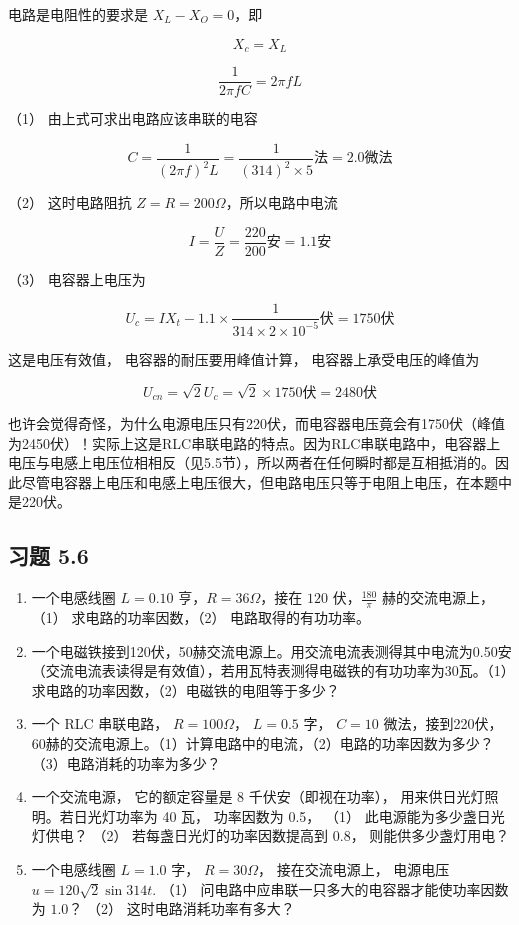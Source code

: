 电路是电阻性的要求是 \(X_{L} - X_{O} = 0\)，即

\[
X_{c} = X_{L}
\]

\[
\frac{1}{2 \pi f C} = 2 \pi f L
\]

（1） 由上式可求出电路应该串联的电容

\[
C = \frac{1}{(2 \pi f)^{2} L} = \frac{1}{(314)^{2} \times 5} \text{法} = 2.0 \text{微法}
\]

（2） 这时电路阻抗 \(Z = R = 200\Omega\)，所以电路中电流

\[
I = \frac{U}{Z} = \frac{220}{200} \text{安} = 1.1 \text{安}
\]

（3） 电容器上电压为

\[
U_{c} = I X_{t} - 1.1 \times \frac{1}{314 \times 2 \times 10^{- 5}} \text{伏} = 1750 \text{伏}
\]

这是电压有效值， 电容器的耐压要用峰值计算， 电容器上承受电压的峰值为

\[
U_{c n} = \sqrt{2} U_{c} = \sqrt{2} \times 1750 \text{伏} = 2480 \text{伏}
\]

也许会觉得奇怪，为什么电源电压只有220伏，而电容器电压竟会有1750伏（峰值为2450伏）！实际上这是RLC串联电路的特点。因为RLC串联电路中，电容器上电压与电感上电压位相相反（见5.5节），所以两者在任何瞬时都是互相抵消的。因此尽管电容器上电压和电感上电压很大，但电路电压只等于电阻上电压，在本题中是220伏。

\subsection{习题 5.6}\label{ux4e60ux9898-5.6}

\begin{enumerate}
\def\labelenumi{\arabic{enumi}.}
\item
  一个电感线圈 \(L = 0.10\) 亨，\(R = 36\Omega\)，接在 \(120\)
  伏，\(\frac{180}{\pi}\) 赫的交流电源上，（1） 求电路的功率因数，（2）
  电路取得的有功功率。
\item
  一个电磁铁接到120伏，50赫交流电源上。用交流电流表测得其中电流为0.50安（交流电流表读得是有效值），若用瓦特表测得电磁铁的有功功率为30瓦。（1）求电路的功率因数，（2）电磁铁的电阻等于多少？
\item
  一个 RLC 串联电路， \(R=100\Omega\)， \(L=0.5\) 字， \(C=10\)
  微法，接到220伏，60赫的交流电源上。（1）计算电路中的电流，（2）电路的功率因数为多少？（3）电路消耗的功率为多少？
\item
  一个交流电源， 它的额定容量是 8 千伏安（即视在功率），
  用来供日光灯照明。若日光灯功率为 40 瓦， 功率因数为 0.5， （1）
  此电源能为多少盏日光灯供电？ （2） 若每盏日光灯的功率因数提高到 0.8，
  则能供多少盏灯用电？
\item
  一个电感线圈 \(L = 1.0\) 字， \(R = 30\Omega\)， 接在交流电源上，
  电源电压 \(u = 120\sqrt{2}\sin 314t\). （1）
  问电路中应串联一只多大的电容器才能使功率因数为 \(1.0\)？ （2）
  这时电路消耗功率有多大？
\end{enumerate}

